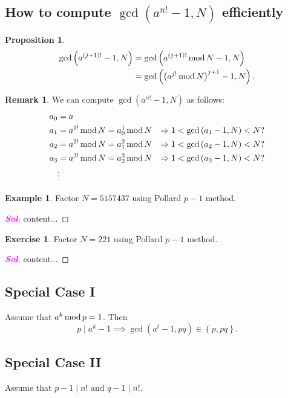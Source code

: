\documentclass[12pt,openany]{book}
\newtheorem{proposition}[theorem]{Proposition}
\theoremstyle{definition}
\newtheorem{remark}{Remark}[chapter]
\newtheorem{exercise}{Exercise}[chapter]
\newtheorem{example}{Example}[chapter]
\newcommand{\set}[1]{\left\{#1\right\}}
\newcommand{\of}[1]{\left( #1 \right)}
\newcommand{\sol}{\textcolor{magenta}{\bf Sol}}
\renewcommand{\mod}{\operatorname{\textnormal{mod}}}
\begin{document}
	\subsection{How to compute $\gcd\of{a^{n!}-1,N}$ efficiently}
	
	\begin{tcolorbox}[colback=white,colframe=procolor,arc=5pt,title={\color{white}\bf Existence of the Multiple of $p-1$}]
		\begin{proposition}
			\begin{align*}
				\gcd\of{a^{\of{j+1}!}-1,N}&=\gcd\of{a^{\of{j+1}!}\mod N-1,N}\\
				&=\gcd\of{\of{a^{j!}\mod N}^{j+1}-1,N}.
			\end{align*}
		\end{proposition}
	\end{tcolorbox}
	\begin{remark}
		We can compute $\gcd\of{a^{n!}-1,N}$ as follows: \begin{align*}
			a_0&=a&\\
			a_1&=a^{1!}\mod N=a_0^1\mod N&\Rightarrow 1<\gcd\of{a_1-1,N}<N?\\
			a_2&=a^{2!}\mod N=a_1^2\mod N&\Rightarrow 1<\gcd\of{a_2-1,N}<N?\\
			a_3&=a^{3!}\mod N=a_2^3\mod N&\Rightarrow 1<\gcd\of{a_3-1,N}<N?\\
			&\vdots &
		\end{align*}
	\end{remark}
	\vspace{8pt}
	\begin{example}
		Factor $N=5157437$ using Pollard $p-1$ method.\begin{proof}[\sol]
			content...
		\end{proof}
	\end{example}
	
	
	\begin{exercise}
		Factor $N=221$ using Pollard $p-1$ method.\begin{proof}[\sol]
			content...
		\end{proof}
	\end{exercise}
	
	\subsection{Special Case I}
	Assume that $a^k\mod p = 1$. Then \[
	p\mid a^k-1\implies \gcd\of{a^t-1,pq}\in\set{p,pq}.
	\]
	
	
	\subsection{Special Case II}
	Assume that $p-1\mid n!$ and $q-1\mid n!$.
	
\end{document}
